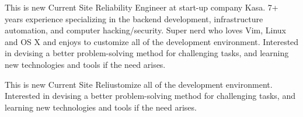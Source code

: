 \begin{cvparagraph}

This is new 
Current Site Reliability Engineer at start-up company Kasa. 7+ years experience specializing in the backend development, infrastructure automation, and computer hacking/security. Super nerd who loves Vim, Linux and OS X and enjoys to customize all of the development environment. Interested in devising a better problem-solving method for challenging tasks, and learning new technologies and tools if the need arises.
\end{cvparagraph}

\begin{cvparagraph}

This is new 
Current Site Reliustomize all of the development environment. Interested in devising a better problem-solving method for challenging tasks, and learning new technologies and tools if the need arises.
\end{cvparagraph}